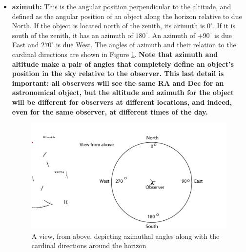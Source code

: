 \documentclass[10pt]{report}
\begin{document}
\begin{itemize}
\item \textbf{azimuth:}  This is the angular position perpendicular to the altitude, and defined as the angular position of an object along the horizon relative to due North.  If the object is located north of the zenith, its azimuth is $0^\circ$.  If it is south of the zenith, it has an azimuth of $180^\circ$.  An azimuth of $+90^\circ$ is due East and $270^\circ$ is due West. The angles of azimuth and their relation to the cardinal directions are shown in Figure \ref{figazo}. \textbf{ Note that azimuth and altitude make a pair of angles that completely define an object's position in the sky relative to the observer.  This last detail is important:  all observers will see the same RA and Dec for an astronomical object, but the altitude and azimuth for the object will be different for observers at different locations, and indeed, even for the same observer, at different times of the day. }

\begin{figure}\label{figazo}
\includegraphics[width=\linewidth]{figazo.png}
\caption{ A view, from above, depicting azimuthal angles along with the cardinal directions around the horizon}
\end{figure}


\end{itemize}
\end{document}

